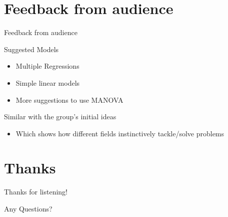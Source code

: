 \documentclass[t, aspectratio=169]{beamer}
\begin{document}
\section{Feedback from audience}
\label{sec:orga4ecb35}
\begin{frame}[label={sec:orga3f4ce7}]{Feedback from audience}
\begin{block}{Suggested Models}
\begin{itemize}
\item Multiple Regressions
\item Simple linear models
\item More suggestions to use MANOVA
\end{itemize}
\end{block}
\begin{block}{Similar with the group's initial ideas}
\begin{itemize}
\item Which shows how different fields instinctively tackle/solve problems
\end{itemize}
\end{block}
\end{frame}


\section{Thanks}
\label{sec:orgec705fb}

\begin{frame}[label={sec:org581484b}]{Thanks for listening!}
\begin{block}{Any Questions?}
\end{block}
\end{frame}
\end{document}
